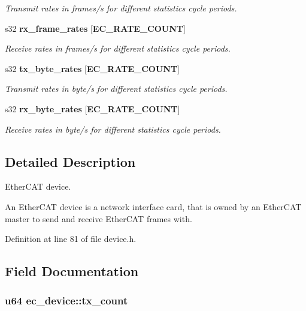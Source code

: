 \begin{DoxyCompactItemize}
\begin{DoxyCompactList}\small\item\em \-Transmit rates in frames/s for different statistics cycle periods. \end{DoxyCompactList}\item 
s32 {\bf rx\-\_\-frame\-\_\-rates} [{\bf \-E\-C\-\_\-\-R\-A\-T\-E\-\_\-\-C\-O\-U\-N\-T}]\label{structec__device_a8e78783b1d22fd12b5d2abe263184bb1}

\begin{DoxyCompactList}\small\item\em \-Receive rates in frames/s for different statistics cycle periods. \end{DoxyCompactList}\item 
s32 {\bf tx\-\_\-byte\-\_\-rates} [{\bf \-E\-C\-\_\-\-R\-A\-T\-E\-\_\-\-C\-O\-U\-N\-T}]
\begin{DoxyCompactList}\small\item\em \-Transmit rates in byte/s for different statistics cycle periods. \end{DoxyCompactList}\item 
s32 {\bf rx\-\_\-byte\-\_\-rates} [{\bf \-E\-C\-\_\-\-R\-A\-T\-E\-\_\-\-C\-O\-U\-N\-T}]
\begin{DoxyCompactList}\small\item\em \-Receive rates in byte/s for different statistics cycle periods. \end{DoxyCompactList}\end{DoxyCompactItemize}


\subsection{\-Detailed \-Description}
\-Ether\-C\-A\-T device. 

\-An \-Ether\-C\-A\-T device is a network interface card, that is owned by an \-Ether\-C\-A\-T master to send and receive \-Ether\-C\-A\-T frames with. 

\-Definition at line 81 of file device.\-h.



\subsection{\-Field \-Documentation}
\subsubsection[{tx\-\_\-count}]{\setlength{\rightskip}{0pt plus 5cm}u64 {\bf ec\-\_\-device\-::tx\-\_\-count}}\label{structec__device_a0cdf625147761dedcd8aa0ee08434949}


